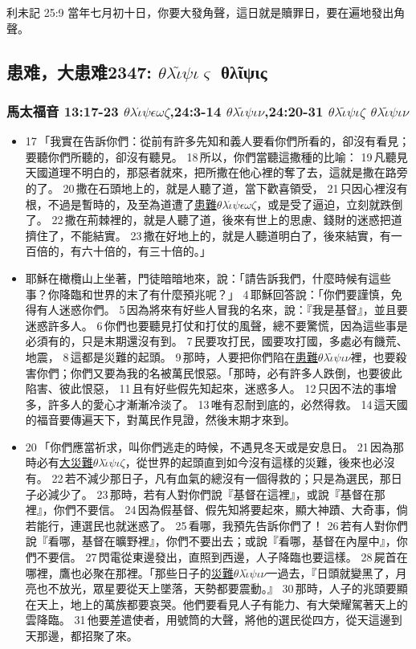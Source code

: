 利未記 25:9
當年七月初十日，你要大發角聲，這日就是贖罪日，要在遍地發出角聲。



\subsection{患难，大患难2347: $\theta$$\lambda$$\widetilde{\iota}$$\psi$$\iota$$\varsigma$ θλῖψις}
\subsubsection{馬太福音 13:17-23 $\theta$$\lambda$$\acute{\iota}$$\psi$$\epsilon$$\omega$$\zeta$,24:3-14 $\theta$$\lambda$$\tilde{\iota}$$\psi$$\iota$$\nu$,24:20-31 $\theta$$\lambda$$\tilde{\iota}$$\psi$$\iota$$\zeta$ $\theta$$\lambda$$\tilde{\iota}$$\psi$$\iota$$\nu$}    
\begin{itemize} 
\itemsep-.25em
\item 17 「我實在告訴你們：從前有許多先知和義人要看你們所看的，卻沒有看見；要聽你們所聽的，卻沒有聽見。 18 所以，你們當聽這撒種的比喻： 19 凡聽見天國道理不明白的，那惡者就來，把所撒在他心裡的奪了去，這就是撒在路旁的了。 20 撒在石頭地上的，就是人聽了道，當下歡喜領受， 21 只因心裡沒有根，不過是暫時的，及至為道遭了\underline{患難$\theta$$\lambda$$\acute{\iota}$$\psi$$\epsilon$$\omega$$\zeta$}，或是受了逼迫，立刻就跌倒了。 22 撒在荊棘裡的，就是人聽了道，後來有世上的思慮、錢財的迷惑把道擠住了，不能結實。 23 撒在好地上的，就是人聽道明白了，後來結實，有一百倍的，有六十倍的，有三十倍的。」   
\item 耶穌在橄欖山上坐著，門徒暗暗地來，說：「請告訴我們，什麼時候有這些事？你降臨和世界的末了有什麼預兆呢？」 4 耶穌回答說：「你們要謹慎，免得有人迷惑你們。 5 因為將來有好些人冒我的名來，說：『我是基督』，並且要迷惑許多人。 6 你們也要聽見打仗和打仗的風聲，總不要驚慌，因為這些事是必須有的，只是末期還沒有到。 7 民要攻打民，國要攻打國，多處必有饑荒、地震， 8 這都是災難的起頭。 9 那時，人要把你們陷在\underline{患難$\theta$$\lambda$$\tilde{\iota}$$\psi$$\iota$$\nu$}裡，也要殺害你們；你們又要為我的名被萬民恨惡。「那時，必有許多人跌倒，也要彼此陷害、彼此恨惡， 11 且有好些假先知起來，迷惑多人。 12 只因不法的事增多，許多人的愛心才漸漸冷淡了。 13 唯有忍耐到底的，必然得救。 14 這天國的福音要傳遍天下，對萬民作見證，然後末期才來到。
\item 20 「你們應當祈求，叫你們逃走的時候，不遇見冬天或是安息日。 21 因為那時必有\underline{大災難$\theta$$\lambda$$\tilde{\iota}$$\psi$$\iota$$\zeta$}，從世界的起頭直到如今沒有這樣的災難，後來也必沒有。 22 若不減少那日子，凡有血氣的總沒有一個得救的；只是為選民，那日子必減少了。 23 那時，若有人對你們說『基督在這裡』，或說『基督在那裡』，你們不要信。 24 因為假基督、假先知將要起來，顯大神蹟、大奇事，倘若能行，連選民也就迷惑了。 25 看哪，我預先告訴你們了！ 26 若有人對你們說『看哪，基督在曠野裡』，你們不要出去；或說『看哪，基督在內屋中』，你們不要信。 27 閃電從東邊發出，直照到西邊，人子降臨也要這樣。 28 屍首在哪裡，鷹也必聚在那裡。「那些日子的\underline{災難$\theta$$\lambda$$\tilde{\iota}$$\psi$$\iota$$\nu$}一過去，『日頭就變黑了，月亮也不放光，眾星要從天上墜落，天勢都要震動。』 30 那時，人子的兆頭要顯在天上，地上的萬族都要哀哭。他們要看見人子有能力、有大榮耀駕著天上的雲降臨。 31 他要差遣使者，用號筒的大聲，將他的選民從四方，從天這邊到天那邊，都招聚了來。

\end{itemize}
